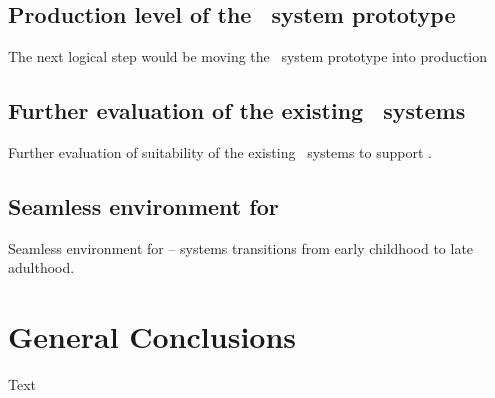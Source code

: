 \subsection{Production level of the \ep~system prototype}
The next logical step  would be moving the \ep~system prototype into production

\subsection{Further evaluation of the existing \ep~systems}
Further evaluation of suitability of the existing \ep~systems to
support \LLLsn.

\subsection{Seamless environment for \LLLs} 
Seamless environment for \LLLs -- systems transitions from early childhood to
late adulthood.

\subsection{}


\subsection{}


\section{General Conclusions}

Text